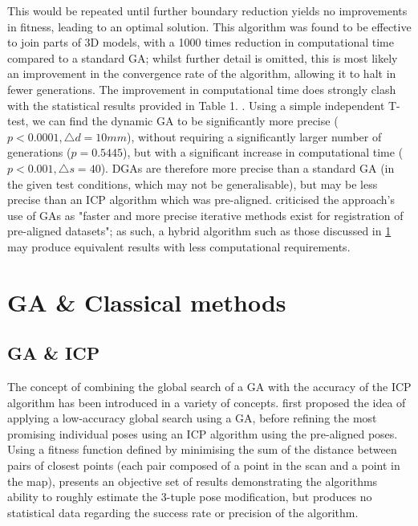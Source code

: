 \documentclass[authoryearcitations]{UoYCSproject}
\begin{document}
This would be repeated until further boundary reduction yields no improvements in fitness, leading to an optimal solution. This algorithm was found to be effective to join parts of 3D models, with a 1000 times reduction in computational time compared to a standard GA; whilst further detail is omitted, this is most likely an improvement in the convergence rate of the algorithm, allowing it to halt in fewer generations. The improvement in computational time does strongly clash with the statistical results provided in Table 1. \cite{Chow2004-xc}. Using a simple independent T-test, we can find the dynamic GA to be significantly more precise ($p<0.0001, \triangle d = 10mm$), without requiring a significantly larger number of generations ($p=0.5445$), but with a significant increase in computational time ($p<0.001, \triangle s = 40$). DGAs are therefore more precise than a standard GA (in the given test conditions, which may not be generalisable), but may be less precise than an ICP algorithm which was pre-aligned. \citet{Lomonosov2006-vq} criticised the approach's use of GAs as "faster and more precise iterative methods exist for registration of pre-aligned datasets"; as such, a hybrid algorithm such as those discussed in \ref{sec:gaClassical} may produce equivalent results with less computational requirements.

\section{GA \& Classical methods}
\label{sec:gaClassical}
\subsection{GA \& ICP}
The concept of combining the global search of a GA with the accuracy of the ICP algorithm has been introduced in a variety of concepts. \citet{Brunnstrom1996-vo} first proposed the idea of applying a low-accuracy global search using a GA, before refining the most promising individual poses using an ICP algorithm using the pre-aligned poses. Using a fitness function defined by minimising the sum of the distance between pairs of closest points (each pair composed of a point in the scan and a point in the map), \citeauthor{Brunnstrom1996-vo} presents an objective set of results demonstrating the algorithms ability to roughly estimate the 3-tuple pose modification, but produces no statistical data regarding the success rate or precision of the algorithm. 
\end{document}
